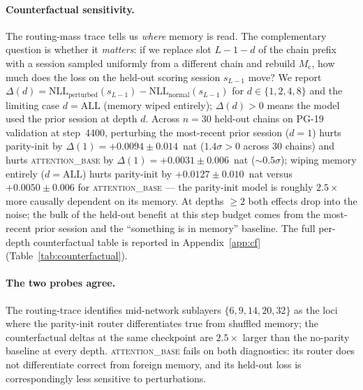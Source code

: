 \documentclass{article}
\newcommand{\Mc}{M_{\text{c}}}
\begin{document}
\paragraph{Counterfactual sensitivity.}
The routing-mass trace tells us \emph{where} memory is read.  The
complementary question is whether it \emph{matters}: if we replace
slot $L-1-d$ of the chain prefix with a session sampled uniformly
from a different chain and rebuild $\Mc$, how much does the loss on
the held-out scoring session $s_{L-1}$ move?  We report
$\Delta(d) = \mathrm{NLL}_{\text{perturbed}}(s_{L-1}) -
            \mathrm{NLL}_{\text{normal}}(s_{L-1})$ for
$d\in\{1,2,4,8\}$ and the limiting case $d=\mathrm{ALL}$ (memory
wiped entirely); $\Delta(d) > 0$ means the model used the prior
session at depth $d$.  Across $n=30$ held-out chains on PG-19
validation at step~4400, perturbing the most-recent prior session
($d{=}1$) hurts parity-init by $\Delta(1) = +0.0094 \pm 0.014$~nat
($1.4\sigma > 0$ across $30$ chains) and hurts
\textsc{attention\_base} by $\Delta(1) = +0.0031 \pm 0.006$~nat
(${\sim}0.5\sigma$); wiping memory entirely ($d=\mathrm{ALL}$) hurts
parity-init by $+0.0127 \pm 0.010$~nat versus $+0.0050 \pm 0.006$
for \textsc{attention\_base} --- the parity-init model is roughly
$2.5\times$ more causally dependent on its memory.  At depths
$\geq 2$ both effects drop into the noise; the bulk of the held-out
benefit at this step budget comes from the most-recent prior session
and the ``something is in memory'' baseline.  The full per-depth
counterfactual table is reported in Appendix~\ref{app:cf}
(Table~\ref{tab:counterfactual}).

\paragraph{The two probes agree.}
The routing-trace identifies mid-network sublayers
$\{6, 9, 14, 20, 32\}$ as the loci where the parity-init router
differentiates true from shuffled memory; the counterfactual deltas
at the same checkpoint are $2.5\times$ larger than the no-parity
baseline at every depth.  \textsc{attention\_base} fails on both
diagnostics: its router does not differentiate correct from foreign
memory, and its held-out loss is correspondingly less sensitive to
perturbations.
\end{document}
